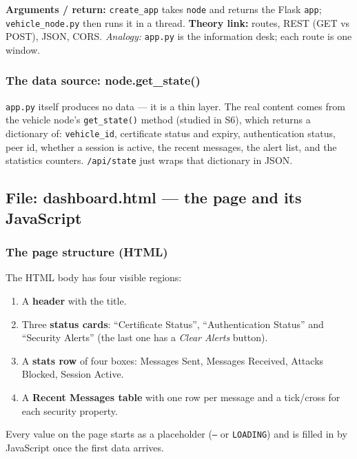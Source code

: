 \documentclass[11pt,a4paper]{report}
\begin{document}
\textbf{Arguments / return:} \texttt{create\_app} takes \texttt{node} and returns
the Flask \texttt{app}; \texttt{vehicle\_node.py} then runs it in a thread.
\textbf{Theory link:} routes, REST (GET vs POST), JSON, CORS.
\emph{Analogy:} \texttt{app.py} is the information desk; each route is one
window.

\subsubsection*{The data source: node.get\_state()}
\texttt{app.py} itself produces no data --- it is a thin layer. The real content
comes from the vehicle node's \texttt{get\_state()} method (studied in S6), which
returns a dictionary of: \texttt{vehicle\_id}, certificate status and expiry,
authentication status, peer id, whether a session is active, the recent messages,
the alert list, and the statistics counters. \texttt{/api/state} just wraps that
dictionary in JSON.

\subsection{File: dashboard.html --- the page and its JavaScript}

\subsubsection*{The page structure (HTML)}
The HTML body has four visible regions:
\begin{enumerate}
  \item A \textbf{header} with the title.
  \item Three \textbf{status cards}: ``Certificate Status'', ``Authentication
        Status'' and ``Security Alerts'' (the last one has a \emph{Clear Alerts}
        button).
  \item A \textbf{stats row} of four boxes: Messages Sent, Messages Received,
        Attacks Blocked, Session Active.
  \item A \textbf{Recent Messages table} with one row per message and a tick/cross
        for each security property.
\end{enumerate}
Every value on the page starts as a placeholder (\texttt{--} or \texttt{LOADING})
and is filled in by JavaScript once the first data arrives.
\end{document}
